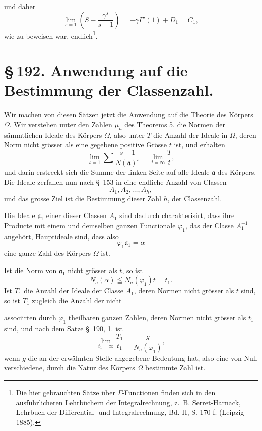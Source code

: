 \documentclass[11pt]{article}
\begin{document}
und daher
\begin{equation}
\lim_{s=1}\left(S-\frac{\gamma^s}{s-1}\right)
=-\gamma\Gamma'(1)+D_1=C_1,
\tag{20}
\end{equation}
wie zu beweisen war, endlich\footnote{Die hier gebrauchten Sätze über $\Gamma$-Functionen finden sich in den ausführlicheren Lehrbüchern der Integralrechnung, z.\ B. Serret-Harnack, Lehrbuch der Differential- und Integralrechnung, Bd. II, S. 170 f. (Leipzig 1885).}.
\section*{\S\,192. Anwendung auf die Bestimmung der Classenzahl.}

Wir machen von diesen Sätzen jetzt die Anwendung auf die Theorie des Körpers $\Omega$. Wir verstehen unter den Zahlen $\mu_n$ des Theorems 5. die Normen der sämmtlichen Ideale des Körpers $\Omega$, also unter $T$ die Anzahl der Ideale in $\Omega$, deren Norm nicht grösser als eine gegebene positive Grösse $t$ ist, und erhalten
\begin{equation}
\lim_{s=1}\sum\frac{s-1}{N(\mathfrak a)^s}=\lim_{t=\infty}\frac{T}{t},
\tag{1}
\end{equation}
und darin erstreckt sich die Summe der linken Seite auf alle Ideale $\mathfrak a$ des Körpers. Die Ideale zerfallen nun nach \S~153 in eine endliche Anzahl von Classen
\[
A_1,A_2,\ldots,A_h,
\]
und das grosse Ziel ist die Bestimmung dieser Zahl $h$, der Classenzahl.

Die Ideale $\mathfrak a_1$ einer dieser Classen $A_1$ sind dadurch charakterisirt, dass ihre Producte mit einem und demselben ganzen Functionale $\varphi_1$, das der Classe $A_1^{-1}$ angehört, Hauptideale sind, dass also
\[
\varphi_1\mathfrak a_1=\alpha
\]
eine ganze Zahl des Körpers $\Omega$ ist.

Ist die Norm von $\mathfrak a_1$ nicht grösser als $t$, so ist
\[
N_a(\alpha)\leqq N_a(\varphi_1)t=t_1.
\]
Ist $T_1$ die Anzahl der Ideale der Classe $A_1$, deren Normen nicht grösser als $t$ sind, so ist $T_1$ zugleich die Anzahl der nicht

associirten durch $\varphi_1$ theilbaren ganzen Zahlen, deren Normen nicht grösser als $t_1$ sind, und nach dem Satze \S~190, 1. ist
\begin{equation}
\lim_{t_1=\infty}\frac{T_1}{t_1}=\frac{g}{N_a(\varphi_1)},
\tag{2}
\end{equation}
wenn $g$ die an der erwähnten Stelle angegebene Bedeutung hat, also eine von Null verschiedene, durch die Natur des Körpers $\Omega$ bestimmte Zahl ist.
\end{document}
